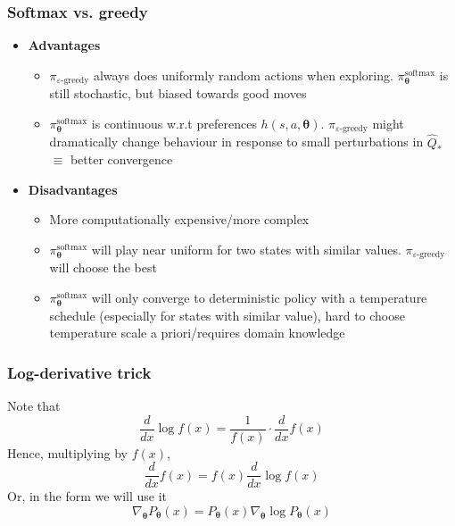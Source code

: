 \documentclass[10pt,a4paper, handout]{beamer}
\newcommand{\bth}{{\boldsymbol{\theta}}}
\begin{document}
\begin{frame}
	\frametitle{Softmax vs. greedy}
	\begin{itemize}
			\item \textbf{Advantages}
			\begin{itemize}
					\item $\pi_{\varepsilon\text{-greedy}}$ always does uniformly random actions when exploring.
						$\pi^{\text{softmax}}_\bth$ is still stochastic, but biased towards good moves
					\item $\pi^{\text{softmax}}_\bth$ is continuous w.r.t preferences $h(s,a,\bth)$.  $\pi_{\varepsilon\text{-greedy}}$ might dramatically change
					behaviour in response to small perturbations in $\hat{Q}_*$ $\equiv$ better
					convergence
				\end{itemize}
			\item \textbf{Disadvantages}
			\begin{itemize}
					\item More computationally expensive/more complex
					\item $\pi^{\text{softmax}}_\bth$ will play near uniform for
					two states with similar values. $\pi_{\varepsilon\text{-greedy}}$ will
					choose the best 
					\item $\pi^{\text{softmax}}_\bth$ will only converge to deterministic policy
					with a temperature schedule (especially for states with similar value), 
					hard to choose temperature scale a priori/requires domain knowledge
				\end{itemize}
		\end{itemize}
\end{frame}

\begin{frame}
	\frametitle{Log-derivative trick}
	Note that 
	$$
	\frac{d}{dx} \log f(x) = \frac{1}{f(x)} \cdot \frac{d}{dx} f(x)
	$$
	Hence, multiplying by $f(x)$,
	$$
	\frac{d}{dx} f(x) = f(x) \frac{d}{dx} \log f(x)
	$$
	Or, in the form we will use it
	$$
	\nabla_\bth P_\bth(x) = P_\bth(x) \nabla_\bth \log P_\bth(x)
	$$
\end{frame}
\end{document}
